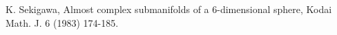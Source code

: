\documentclass[12pt]{article}
\def\red{\color{red}}
\numberwithin{equation}{section}
\begin{document}
\begin{thebibliography}{20}
 K. Sekigawa, Almost complex submanifolds of a 6-dimensional sphere,
Kodai Math. J. 6 (1983) 174-185.













%
%







\end{thebibliography}
\end{document}
